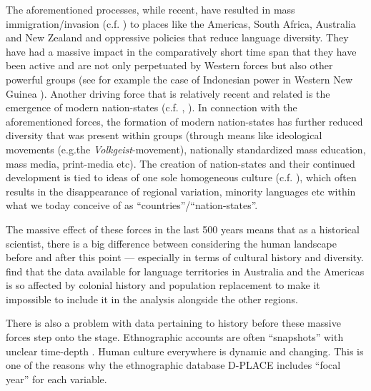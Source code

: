 \documentclass[unnumsec,webpdf,modern,medium]{oup-authoring-template}
\begin{document}
\begin{appendices}
The aforementioned processes, while recent, have resulted in mass immigration/invasion (c.f. \citet{invasion_day}) to places like the Americas, South Africa, Australia and New Zealand and oppressive policies that reduce language diversity. They have had a massive impact in the comparatively short time span that they have been active and are not only perpetuated by Western forces but also other powerful groups (see for example the case of Indonesian power in Western New Guinea \citep{gietzelt1989indonesianization}). Another driving force that is relatively recent and related is the emergence of modern nation-states (c.f. \citet{foucault2007security}, \citet[21-22]{oakes2001language}). In connection with the aforementioned forces, the formation of modern nation-states has further reduced diversity that was present within groups (through means like ideological movements (e.g.the \emph{Volkgeist}-movement), nationally standardized mass education, mass media, print-media etc). The creation of nation-states and their continued development is tied to ideas of one sole homogeneous culture (c.f. \citet{encyclo_nationalism}), which often results in the disappearance of regional variation, minority languages etc within what we today conceive of as ``countries''/``nation-states''. 

The massive effect of these forces in the last 500 years means that as a historical scientist, there is a big difference between considering the human landscape before and after this point --- especially in terms of cultural history and diversity. \citet[7340-7341]{curriemace2009} find that the data available for language territories in Australia and the Americas is so affected by colonial history and population replacement to make it impossible to include it in the analysis alongside the other regions. 

There is also a problem with data pertaining to history before these massive forces step onto the stage. Ethnographic accounts are often ``snapshots'' with unclear time-depth 
 \citep[113]{bedford2008northern}. Human culture everywhere is dynamic and changing. This is one of the reasons why the ethnographic database D-PLACE \citep{d_place_all} includes ``focal year'' for each variable.






\end{appendices}
\end{document}
